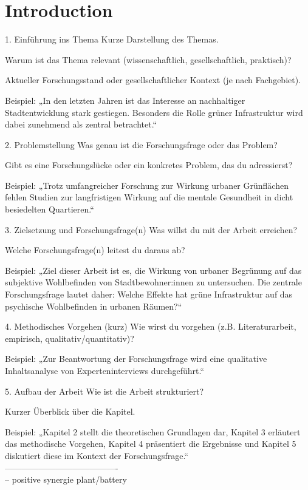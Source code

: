 \chapter{Introduction}

1. Einführung ins Thema
Kurze Darstellung des Themas.

Warum ist das Thema relevant (wissenschaftlich, gesellschaftlich, praktisch)?

Aktueller Forschungsstand oder gesellschaftlicher Kontext (je nach Fachgebiet).

Beispiel:
„In den letzten Jahren ist das Interesse an nachhaltiger Stadtentwicklung stark gestiegen. Besonders die Rolle grüner Infrastruktur wird dabei zunehmend als zentral betrachtet.“

2. Problemstellung
Was genau ist die Forschungsfrage oder das Problem?

Gibt es eine Forschungslücke oder ein konkretes Problem, das du adressierst?

Beispiel:
„Trotz umfangreicher Forschung zur Wirkung urbaner Grünflächen fehlen Studien zur langfristigen Wirkung auf die mentale Gesundheit in dicht besiedelten Quartieren.“

3. Zielsetzung und Forschungsfrage(n)
Was willst du mit der Arbeit erreichen?

Welche Forschungsfrage(n) leitest du daraus ab?


Beispiel:
„Ziel dieser Arbeit ist es, die Wirkung von urbaner Begrünung auf das subjektive Wohlbefinden von Stadtbewohner:innen zu untersuchen. Die zentrale Forschungsfrage lautet daher: Welche Effekte hat grüne Infrastruktur auf das psychische Wohlbefinden in urbanen Räumen?“

4. Methodisches Vorgehen (kurz)
Wie wirst du vorgehen (z.B. Literaturarbeit, empirisch, qualitativ/quantitativ)?

Beispiel:
„Zur Beantwortung der Forschungsfrage wird eine qualitative Inhaltsanalyse von Experteninterviews durchgeführt.“

5. Aufbau der Arbeit
Wie ist die Arbeit strukturiert?

Kurzer Überblick über die Kapitel.

Beispiel:
„Kapitel 2 stellt die theoretischen Grundlagen dar, Kapitel 3 erläutert das methodische Vorgehen, Kapitel 4 präsentiert
die Ergebnisse und Kapitel 5 diskutiert diese im Kontext der Forschungsfrage.“\\
----------------------------------------\\
-- positive synergie plant/battery

